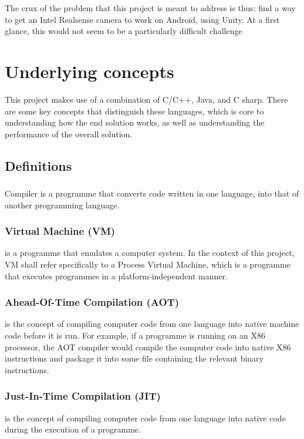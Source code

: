 The crux of the problem that this project is meant to address is thus: find a way to get an Intel Realsense camera to work on Android, using Unity. At a first glance, this would not seem to be a particularly difficult challenge

\section{Underlying concepts}
This project makes use of a combination of C/C++, Java, and C sharp. There are some key concepts that distinguish these languages, which is core to understanding how the end solution works, as well as understanding the performance of the overall solution.
    \subsection{Definitions}
        \subsubsection{}{Compiler} is a programme that converts code written in one language, into that of another programming language.
        \subsubsection{Virtual Machine (VM)} is a programme that emulates a computer system. In the context of this project, VM shall refer specifically to a Process Virtual Machine, which is a programme that executes programmes in a platform-independent manner.
        \subsubsection{Ahead-Of-Time Compilation (AOT)} is the concept of compiling computer code from one language into native machine code before it is run. For example, if a programme is running on an X86 processor, the AOT compiler would compile the computer code into native X86 instructions and package it into some file containing the relevant binary instructions.
        \subsubsection{Just-In-Time Compilation (JIT)} is the concept of compiling computer code from one language into native code during the execution of a programme.
